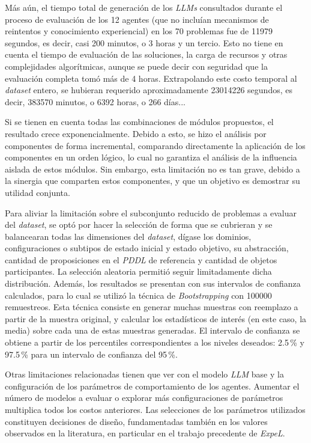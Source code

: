 Más aún, el tiempo total de generación de los \textit{LLMs} consultados durante el proceso de evaluación de los 12 agentes (que no incluían mecanismos de reintentos y conocimiento experiencial) en los 70 problemas fue de 11979 segundos, es decir, casi 200 minutos, o 3 horas y un tercio. Esto no tiene en cuenta el tiempo de evaluación de las soluciones, la carga de recursos y otras complejidades algorítmicas, aunque se puede decir con seguridad que la evaluación completa tomó más de 4 horas. Extrapolando este costo temporal al \textit{dataset} entero, se hubieran requerido aproximadamente 23014226 segundos, es decir, 383570 minutos, o 6392 horas, o 266 días...

Si se tienen en cuenta todas las combinaciones de módulos propuestos, el resultado crece exponencialmente. Debido a esto, se hizo el análisis por componentes de forma incremental, comparando directamente la aplicación de los componentes en un orden lógico, lo cual no garantiza el análisis de la influencia aislada de estos módulos. Sin embargo, esta limitación no es tan grave, debido a la sinergia que comparten estos componentes, y que un objetivo es demostrar su utilidad conjunta.

Para aliviar la limitación sobre el subconjunto reducido de problemas a evaluar del \textit{dataset}, se optó por hacer la selección de forma que se cubrieran y se balancearan todas las dimensiones del \textit{dataset}, dígase los dominios, configuraciones o subtipos de estado inicial y estado objetivo, su abstracción, cantidad de proposiciones en el \textit{PDDL} de referencia y cantidad de objetos participantes. La selección aleatoria permitió seguir limitadamente dicha distribución. Además, los resultados se presentan con sus intervalos de confianza calculados, para lo cual se utilizó la técnica de \textit{Bootstrapping} \parencite{efron1994introduction} con 100000 remuestreos. Esta técnica consiste en generar muchas muestras con reemplazo a partir de la muestra original, y calcular los estadísticos de interés (en este caso, la media) sobre cada una de estas muestras generadas. El intervalo de confianza se obtiene a partir de los percentiles correspondientes a los niveles deseados: 2.5\,\% y 97.5\,\% para un intervalo de confianza del 95\,\%.

Otras limitaciones relacionadas tienen que ver con el modelo \textit{LLM} base y la configuración de los parámetros de comportamiento de los agentes. Aumentar el número de modelos a evaluar o explorar más configuraciones de parámetros multiplica todos los costos anteriores. Las selecciones de los parámetros utilizados constituyen decisiones de diseño, fundamentadas también en los valores observados en la literatura, en particular en el trabajo precedente de \textit{ExpeL}.

